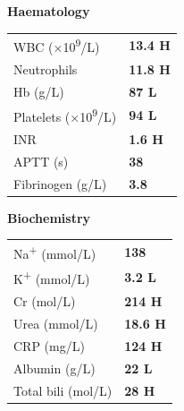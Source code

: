 \documentclass[11pt,a4paper]{scrartcl}
\newcommand{\labrow}[2]{%
  {\footnotesize\sffamily\color{TextGray}#1} & {\footnotesize\sffamily\bfseries\color{MedNavy}#2}%
}
\begin{document}
\noindent
\begin{tcolorbox}[sectionbox, title={\faFlask\enspace Laboratory Results — 07:00
  \hfill{\normalfont\tiny\color{white!70!MedTeal}
  \textbf{H} = High \quad \textbf{L} = Low \quad $\bullet$ = Critical}}]

  \footnotesize\sffamily
  \noindent
  \begin{minipage}[t]{0.32\linewidth}
    \textbf{\color{MedNavy}Haematology}\par\vspace{2pt}
    \begin{tabular}{@{}ll@{}}
      \labrow{WBC ($\times$10\textsuperscript{9}/L)}{13.4 \textbf{H}} \\[2pt]
      \labrow{Neutrophils}{11.8 \textbf{H}} \\[2pt]
      \labrow{Hb (g/L)}{87 \textbf{L}} \\[2pt]
      \labrow{Platelets ($\times$10\textsuperscript{9}/L)}{94 \textbf{L}} \\[2pt]
      \labrow{INR}{1.6 \textbf{H}} \\[2pt]
      \labrow{APTT (s)}{38} \\[2pt]
      \labrow{Fibrinogen (g/L)}{3.8} \\
    \end{tabular}
  \end{minipage}\hfill
  \begin{minipage}[t]{0.32\linewidth}
    \textbf{\color{MedNavy}Biochemistry}\par\vspace{2pt}
    \begin{tabular}{@{}ll@{}}
      \labrow{Na\textsuperscript{+} (mmol/L)}{138} \\[2pt]
      \labrow{K\textsuperscript{+} (mmol/L)}{3.2 \textbf{L}} \\[2pt]
      \labrow{Cr (\textmu{}mol/L)}{214 \textbf{H}} \\[2pt]
      \labrow{Urea (mmol/L)}{18.6 \textbf{H}} \\[2pt]
      \labrow{CRP (mg/L)}{124 \textbf{H}} \\[2pt]
      \labrow{Albumin (g/L)}{22 \textbf{L}} \\[2pt]
      \labrow{Total bili (\textmu{}mol/L)}{28 \textbf{H}} \\
    \end{tabular}
  \end{minipage}\hfill
  \begin{minipage}[t]{0.32\linewidth}

\end{minipage}
\end{tcolorbox}
\end{document}
